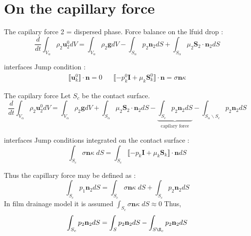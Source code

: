 \documentclass{sintefbeamer}
\newcommand{\Jump}[1]{\llbracket #1 \rrbracket \cdot \textbf{n} }
\newcommand{\ddt}{\frac{d}{d t}}
\begin{document}
\section*{On the capillary force }

\begin{frame}
  {The capilary force}
  2 = dispersed phase. 
  Force balance on the lfuid drop :
  \begin{equation*}
    \ddt \int_{V_\alpha} \rho_2 \textbf{u}^0_2 dV
    = 
    \int_{V_\alpha} \rho_2 \textbf{g} dV
    - \int_{S_\alpha} p_2 \textbf{n}_2 dS
    + \int_{S_\alpha} \mu_2 \textbf{S}_2 \cdot \textbf{n}_2 dS
  \end{equation*}

  interfaces Jump condition :
  \begin{align*}
    \Jump{\textbf{u}_k^0} = 0
    &&
    \Jump{-p_k^0 \textbf{I}+ \mu_k \textbf{S}_k^0} 
    =
    \sigma\textbf{n}\kappa
    \label{eq:surface_tension}
\end{align*}

\end{frame}

\begin{frame}
  {The capilary force}
  Let $S_c$ be the contact surface.
  \begin{equation*}
    \ddt \int_{V_\alpha} \rho_2 \textbf{u}^0_2 dV
    = 
    \int_{V_\alpha} \rho_2 \textbf{g} dV
    + \int_{S_\alpha} \mu_2 \textbf{S}_2 \cdot \textbf{n}_2 dS
    - \underbrace{\int_{S_c} p_2 \textbf{n}_2 dS}_\text{capilary force}
    - \int_{S_\alpha \backslash S_c} p_2 \textbf{n}_2 dS
  \end{equation*}

  interfaces Jump conditions integrated  on the contact surface :
  \begin{equation}
    \int_{S_c} \sigma\textbf{n}\kappa \; dS
    =
    \int_{S_c} \Jump{-p_k \textbf{I}+ \mu_k \textbf{S}_k} dS
\end{equation}

Thus the capillary force may be defined as : 
  \begin{equation}
    \int_{ S_c} p_1 \textbf{n}_2 dS
    =
    \int_{S_c} \sigma\textbf{n}\kappa \; dS
    + \int_{ S_c} p_2 \textbf{n}_2 dS
  \end{equation}
  In film drainage model it is assumed $\int_{S_c} \sigma\textbf{n}\kappa \; dS \approx 0 $ Thus, 
  \begin{equation*}
    \int_{ S_c} p_2 \textbf{n}_2 dS
    = \int_{ S} p_2 \textbf{n}_2 dS
    - \int_{ S \S_c} p_2 \textbf{n}_2 dS
  \end{equation*}

\end{frame}
\end{document}
